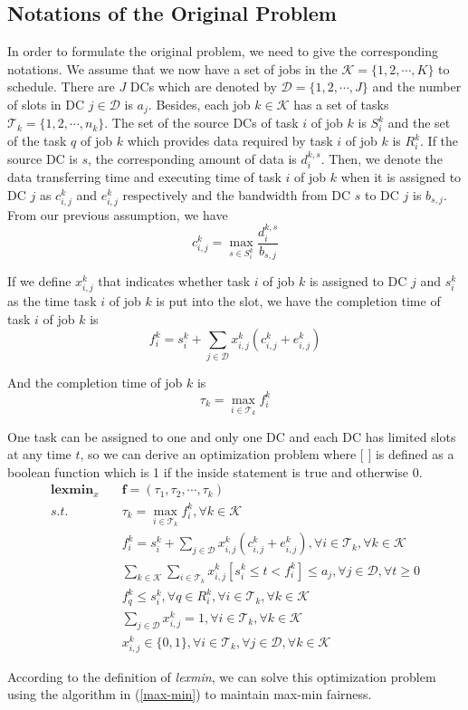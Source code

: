 \subsection{Notations of the Original Problem}
In order to formulate the original problem, we need to give the corresponding notations. We assume that we now have a set of jobs in the $\mathcal{K} = \{1,2,\cdots,K\}$ to schedule. There are $J$ DCs which are denoted by $\mathcal{D} = \{1,2,\cdots,J\}$ and the number of slots in DC $j\in\mathcal{D}$ is $a_j$. Besides, each job $k\in\mathcal{K}$ has a set of tasks $\mathcal{T}_k = \{1,2,\cdots,n_k\}$. The set of the source DCs of task $i$ of job $k$ is $S_i^k$ and the set of the task $q$ of job $k$ which provides data required by task $i$ of job $k$ is $R_i^k$. If the source DC is $s$, the corresponding amount of data is $d_i^{k,s}$. Then, we denote the data transferring time and executing time of task $i$ of job $k$ when it is assigned to DC $j$ as $c_{i,j}^k$ and $e_{i,j}^k$ respectively and the bandwidth from DC $s$ to DC $j$ is $b_{s,j}$. From our previous assumption, we have
\begin{equation}
    c_{i,j}^k = \max_{s\in S^k_i} \frac{d_{i}^{k,s}}{b_{s,j}}
\end{equation}

If we define $x_{i,j}^k$ that indicates whether task $i$ of job $k$ is assigned to DC $j$ and $s_i^k$ as the time task $i$ of job $k$ is put into the slot, we have the completion time of task $i$ of job $k$ is
\begin{equation}
    f_i^k = s_i^k+ \sum_{j\in \mathcal{D}} x_{i,j}^k(c_{i,j}^k+e_{i,j}^k)
\end{equation}

And the completion time of job $k$ is
\begin{equation}
    \tau_k = \max_{i\in\mathcal{T}_k} f_i^k
\end{equation}

One task can be assigned to one and only one DC and each DC has limited slots at any time $t$, so we can derive an optimization problem where $\text{[   ]}$ is defined as a boolean function which is 1 if the inside statement is true and otherwise 0.
\begin{align}
        \textbf{lexmin}_{x} \quad& \mathbf{f} = (\tau_1,\tau_2,\cdots,\tau_k)\\
    s.t. \quad & \tau_k = \max_{i\in\mathcal{T}_k} f_i^k,\forall k\in\mathcal{K}\\
    & f_i^k = s_i^k+ \sum_{j\in \mathcal{D}} x_{i,j}^k(c_{i,j}^k+e_{i,j}^k), \forall i \in \mathcal{T}_k,\forall k \in \mathcal{K}\\
    &\sum_{k\in\mathcal{K}}\sum_{i\in\mathcal{T}_k} x_{i,j}^k[s_i^k\le t< f_i^k]\le a_j, \forall j \in \mathcal{D}, \forall t\ge 0\\
    & f_q^k\le s_i^k, \forall q\in R_i^k,\forall i \in \mathcal{T}_k,\forall k \in \mathcal{K}\\
    &\sum_{j\in\mathcal{D}}x_{i,j}^k = 1,\forall i \in\mathcal{T}_k,\forall k\in\mathcal{K}\\
    & x_{i,j}^k \in \{0,1\}, \forall i \in \mathcal{T}_k,\forall{j}\in\mathcal{D},\forall k \in \mathcal{K}
\end{align}

According to the definition of \emph{lexmin}, we can solve this optimization problem using the algorithm in (\ref{max-min}) to maintain max-min fairness.
